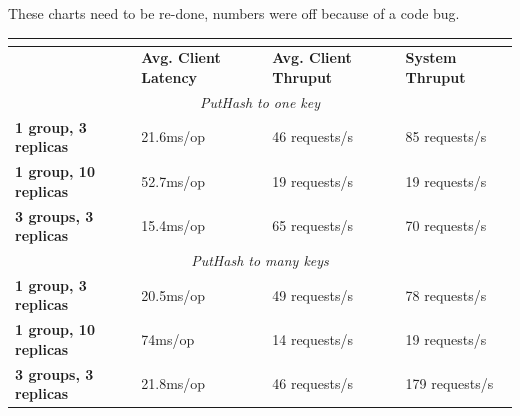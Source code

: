 \documentclass[letterpaper,10pt]{article}
\begin{document}
These charts need to be re-done, numbers were off because of a code bug.
\begin{table}[h]
\begin{tabular}{|l|l|l|l|}
\hline
\multicolumn{4}{|c|}{\cellcolor[HTML]{C0C0C0}{\color[HTML]{000000} \textbf{Vanilla Paxos}}}                              \\ \hline
                              & \textbf{Avg. Client Latency} & \textbf{Avg. Client Thruput} & \textbf{System Thruput} \\ \hline
\multicolumn{4}{|c|}{\textit{PutHash to one key}}                                                                     \\ \hline
\textbf{1 group, 3 replicas}  & 21.6ms/op                    & 46 requests/s                & 85 requests/s           \\ \hline
\textbf{1 group, 10 replicas} & 52.7ms/op                    & 19 requests/s                & 19 requests/s           \\ \hline
\textbf{3 groups, 3 replicas} & 15.4ms/op                    & 65 requests/s                & 70 requests/s           \\ \hline
\multicolumn{4}{|c|}{\textit{PutHash to many keys}}                                                                 \\ \hline
\textbf{1 group, 3 replicas}  & 20.5ms/op                    & 49 requests/s                & 78 requests/s           \\ \hline
\textbf{1 group, 10 replicas} & 74ms/op                      & 14 requests/s                & 19 requests/s           \\ \hline
\textbf{3 groups, 3 replicas} & 21.8ms/op                    & 46 requests/s                & 179 requests/s          \\ \hline
\end{tabular}
\end{table}

\end{document}
